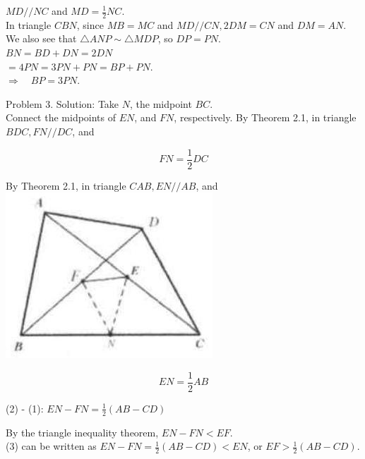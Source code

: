 \documentclass[10pt]{article}
\begin{document}
\(M D / / N C\) and \(M D=\frac{1}{2} N C\).\\
In triangle \(C B N\), since \(M B=M C\) and \(M D / / C N, 2 D M=C N\) and \(D M=A N\).\\
We also see that \(\triangle A N P \sim \triangle M D P\), so \(D P=P N\).\\
\(B N=B D+D N=2 D N\)\\
\(=4 P N=3 P N+P N=B P+P N\).\\
\(\Rightarrow \quad B P=3 P N\).

Problem 3. Solution:
Take \(N\), the midpoint \(B C\).\\
Connect the midpoints of \(E N\), and \(F N\), respectively. By Theorem 2.1, in triangle \(B D C, F N / / D C\), and

\[
F N=\frac{1}{2} D C
\]

By Theorem 2.1, in triangle \(C A B, E N / / A B\), and\\
\includegraphics[max width=\textwidth, center]{2025_04_17_97bc1f7e44d93c271a88g-048}

\[
E N=\frac{1}{2} A B
\]

(2) - (1): \(E N-F N=\frac{1}{2}(A B-C D)\)

By the triangle inequality theorem, \(E N-F N<E F\).\\
(3) can be written as \(E N-F N=\frac{1}{2}(A B-C D)<E N\), or \(E F>\frac{1}{2}(A B-C D)\).
\end{document}
